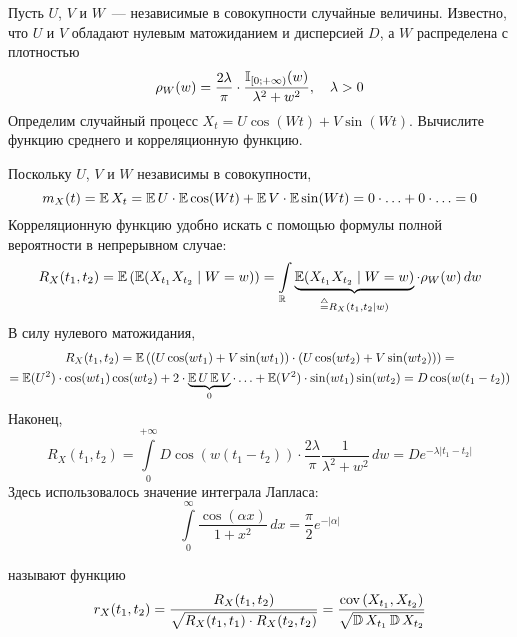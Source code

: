 \begin{exercise}
    \label{exercise:basics:cos_and_sin}
    Пусть $ U $, $ V $ и $ W $~--- независимые в совокупности случайные величины.
    Известно, что $ U $ и $ V $ обладают нулевым матожиданием и дисперсией $ D $,
    а $ W $ распределена с плотностью
    \[
        \rho_W(w) = \frac{2 \lambda}{\pi} \cdot \frac{\mathbb{I}_{[0; +\infty)}(w)}{\lambda^2 + w^2}, \quad \lambda > 0
    \]
    Определим случайный процесс $ X_t = U \cos(W t) + V \sin(W t) $.
    Вычислите функцию среднего и корреляционную функцию.
\end{exercise}

\begin{solution}
    Поскольку $ U $, $ V $ и $ W $ независимы в совокупности,
    \[
        m_X(t) = \operatorname{\mathbb{E}} X_t = \operatorname{\mathbb{E}} U \cdot \operatorname{\mathbb{E}} \cos(W t) + \operatorname{\mathbb{E}} V \cdot \operatorname{\mathbb{E}} \sin(W t) = 0 \cdot \ldots + 0 \cdot \ldots = 0
    \]
    Корреляционную функцию удобно искать с помощью формулы полной вероятности в непрерывном случае:
    \[
        R_X(t_1, t_2) = \operatorname{\mathbb{E}} \left( \operatorname{\mathbb{E}}(X_{t_1} X_{t_2} \mid W = w) \right) = \int\limits_{\mathbb{R}} \underbrace{\operatorname{\mathbb{E}}(X_{t_1} X_{t_2} \mid W = w)}_{\overset{\triangle}{=} R_X(t_1, t_2 \mid w)} \cdot \rho_W(w) \, dw
    \]
    В силу нулевого матожидания,
    \begin{multline*}
        R_X(t_1, t_2) = \operatorname{\mathbb{E}} \left( (U \cos(w t_1) + V \sin(w t_1)) \cdot (U \cos(w t_2) + V \sin(w t_2)) \right) = \\
        = \operatorname{\mathbb{E}} (U^2) \cdot \cos(w t_1) \cos(w t_2) + 2 \cdot \underbrace{\operatorname{\mathbb{E}} U \operatorname{\mathbb{E}} V}_{0} \cdot \ldots + \operatorname{\mathbb{E}} (V^2) \cdot \sin(w t_1) \sin(w t_2) = D \cos(w(t_1 - t_2))
    \end{multline*}
    Наконец,
    \[
        R_X(t_1, t_2) = \int\limits_0^{+\infty} D \cos(w(t_1 - t_2)) \cdot \frac{2 \lambda}{\pi} \frac{1}{\lambda^2 + w^2} \, dw = D e^{-\lambda |t_1 - t_2|}
    \]
    Здесь использовалось значение интеграла Лапласа:
    \[
        \int\limits_0^\infty \frac{\cos(\alpha x)}{1 + x^2} \, dx = \frac{\pi}{2} e^{-|\alpha|}
    \]
\end{solution}


\begin{definition}
    \label{definition:basics:correlation_coefficient_function}
     называют функцию
    \[
        r_X(t_1, t_2) = \frac{R_X(t_1, t_2)}{\sqrt{R_X(t_1, t_1) \cdot R_X(t_2, t_2)}} = \frac{\textnormal{cov}\left(X_{t_1}, X_{t_2}\right)}{\sqrt{\operatorname{\mathbb{D}} X_{t_1} \operatorname{\mathbb{D}} X_{t_2}}}
    \]
\end{definition}

